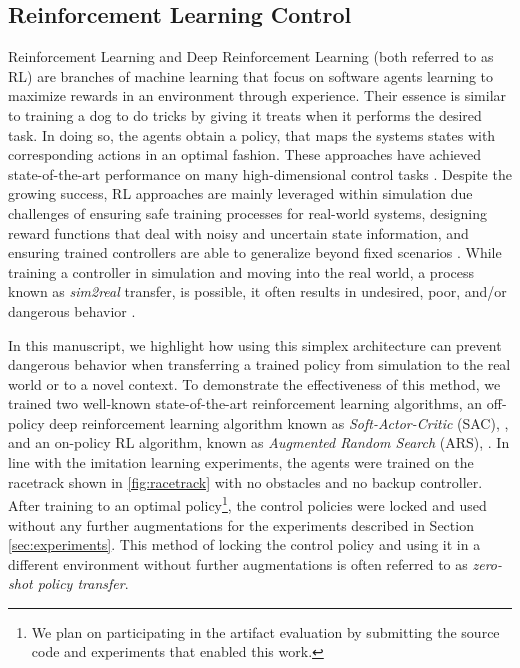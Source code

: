 \documentclass[manuscript,screen,review]{acmart}
\begin{document}
\subsection{Reinforcement Learning Control}
Reinforcement Learning and Deep Reinforcement Learning (both referred to as RL) are branches of machine learning that focus on software agents learning to maximize rewards in an environment through experience. Their essence is similar to training a dog to do tricks by giving it treats when it performs the desired task. In doing so, the agents obtain a policy, that maps the systems states with corresponding actions in an optimal fashion. These approaches have achieved state-of-the-art performance on many high-dimensional control tasks \cite{lillicrap2015continuous, schulman2017proximal, mania2018simple, haarnoja2018soft}. Despite the growing success, RL approaches are mainly leveraged within simulation due challenges of ensuring safe training processes for real-world systems, designing reward functions that deal with noisy and uncertain state information, and ensuring trained controllers are able to generalize beyond fixed scenarios \cite{dulac2019challenges}. While training a controller in simulation and moving into the real world, a process known as \emph{sim2real} transfer, is possible, it often results in undesired, poor, and/or dangerous behavior \cite{jang2019ICCPS, kadian2019we}.

In this manuscript, we highlight how using this simplex architecture can prevent dangerous behavior when transferring a trained policy from simulation to the real world or to a novel context.
To demonstrate the effectiveness of this method, we trained  two well-known state-of-the-art reinforcement learning algorithms, an off-policy deep reinforcement learning algorithm known as \emph{Soft-Actor-Critic} (SAC), \cite{haarnoja2018soft}, and an on-policy RL algorithm, known as \emph{Augmented Random Search} (ARS), \cite{mania2018simple}. %
In line with the imitation learning experiments, the agents were trained on the racetrack shown in \ref{fig:racetrack} with no obstacles and no backup controller. After training to an optimal policy\footnote{We plan on participating in the artifact evaluation by submitting the source code and experiments that enabled this work.}, the control policies were locked and used without any further augmentations for the experiments described in Section \ref{sec:experiments}. This method of locking the control policy and using it in a different environment without further augmentations is often referred to as \emph{zero-shot policy transfer}.
\end{document}
